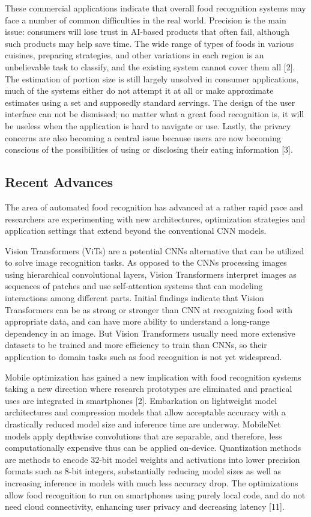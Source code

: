 \documentclass[12pt, openany]{report}
\begin{document}
These commercial applications indicate that overall food recognition systems may face a number of common difficulties in the real world. Precision is the main issue: consumers will lose trust in AI-based products that often fail, although such products may help save time. The wide range of types of foods in various cuisines, preparing strategies, and other variations in each region is an unbelievable task to classify, and the existing system cannot cover them all [2]. The estimation of portion size is still largely unsolved in consumer applications, much of the systems either do not attempt it at all or make approximate estimates using a set and supposedly standard servings. The design of the user interface can not be dismissed; no matter what a great food recognition is, it will be useless when the application is hard to navigate or use. Lastly, the privacy concerns are also becoming a central issue because users are now becoming conscious of the possibilities of using or disclosing their eating information [3].

\subsection{Recent Advances}
The area of automated food recognition has advanced at a rather rapid pace and researchers are experimenting with new architectures, optimization strategies and application settings that extend beyond the conventional CNN models.

Vision Transformers (ViTs) are a potential CNNs alternative that can be utilized to solve image recognition tasks. As opposed to the CNNs processing images using hierarchical convolutional layers, Vision Transformers interpret images as sequences of patches and use self-attention systems that can modeling interactions among different parts. Initial findings indicate that Vision Transformers can be as strong or stronger than CNN at recognizing food with appropriate data, and can have more ability to understand a long-range dependency in an image. But Vision Transformers usually need more extensive datasets to be trained and more efficiency to train than CNNs, so their application to domain tasks such as food recognition is not yet widespread.

Mobile optimization has gained a new implication with food recognition systems taking a new direction where research prototypes are eliminated and practical uses are integrated in smartphones [2]. Embarkation on lightweight model architectures and compression models that allow acceptable accuracy with a drastically reduced model size and inference time are underway. MobileNet models apply depthwise convolutions that are separable, and therefore, less computationally expensive thus can be applied on-device. Quantization methods are methods to encode 32-bit model weights and activations into lower precision formats such as 8-bit integers, substantially reducing model sizes as well as increasing inference in models with much less accuracy drop. The optimizations allow food recognition to run on smartphones using purely local code, and do not need cloud connectivity, enhancing user privacy and decreasing latency [11].
\end{document}

